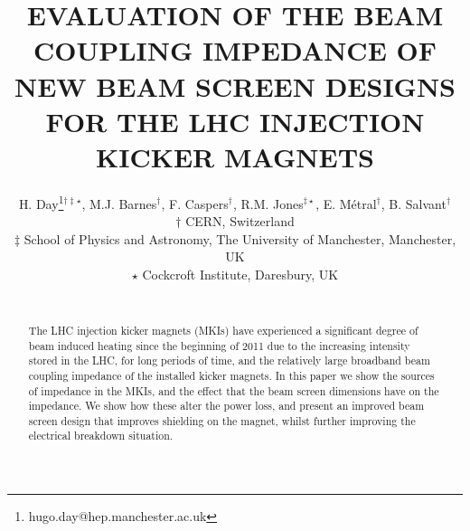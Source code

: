 \documentclass{JAC2003}
\begin{document}
\title{EVALUATION OF THE BEAM COUPLING IMPEDANCE OF NEW BEAM SCREEN DESIGNS FOR THE LHC INJECTION KICKER MAGNETS}
\author{H. Day\thanks{hugo.day@hep.manchester.ac.uk}$^{\dagger\ddagger\star}$, M.J. Barnes$^{\dagger}$, F. Caspers$^{\dagger}$, R.M. Jones$^{\ddagger \star}$, E. Métral$^{\dagger}$, B. Salvant$^{\dagger}$ \\
$\dagger$ CERN, Switzerland \\
$\ddagger$ School of Physics and Astronomy, The University of Manchester, Manchester, UK \\
$\star$ Cockcroft Institute, Daresbury, UK \\
\\}

\maketitle 


\begin{abstract}
The LHC injection kicker magnets (MKIs) have experienced a significant degree of beam induced heating since the beginning of 2011 due to the increasing intensity stored in the LHC, for long periods of time, and the relatively large broadband beam coupling impedance of the installed kicker magnets. In this paper we show the sources of impedance in the MKIs, and the effect that the beam screen dimensions have on the impedance. We show how these alter the power loss, and present an improved beam screen design that improves shielding on the magnet, whilst further improving the electrical breakdown situation.
\end{abstract}


%
%
%
\end{document}
